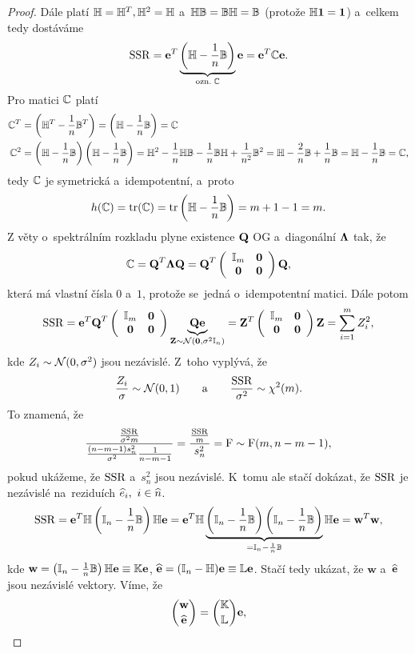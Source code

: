 \begin{proof}
Dále platí $\mathbb{H} = \mathbb{H}^T, \mathbb{H}^2 = \mathbb{H}$ a~$\mathbb{H} \mathbb{B} = \mathbb{B} \mathbb{H} = \mathbb{B}$ (protože $\mathbb{H} \mathbf{1} = \mathbf{1}$) a~celkem tedy dostáváme
 $$
\mathrm{SSR} = \mathbf{e}^T \underbrace{\left(\mathbb{H} - \frac{1}{n} \mathbb{B} \right)}_{\text{ozn.} \; \mathbb{C}} \mathbf{e} = \mathbf{e}^T \mathbb{C} \mathbf{e}.
 $$
Pro matici $\mathbb{C}$ platí
\begin{align*}
\mathbb{C}^T & = \left(\mathbb{H}^T - \frac{1}{n} \mathbb{B}^T \right) = \left(\mathbb{H} - \frac{1}{n} \mathbb{B} \right) = \mathbb{C} \\
\mathbb{C}^2 & = \left(\mathbb{H} - \frac{1}{n} \mathbb{B} \right)\left(\mathbb{H} - \frac{1}{n} \mathbb{B} \right) = \mathbb{H}^2 - \frac{1}{n} \mathbb{H} \mathbb{B} - \frac{1}{n} \mathbb{B} \mathbb{H} + \frac{1}{n^2} \mathbb{B}^2 = \mathbb{H} - \frac{2}{n} \mathbb{B} + \frac{1}{n} \mathbb{B} = \mathbb{H} - \frac{1}{n} \mathbb{B} = \mathbb{C},
\end{align*}
tedy $\mathbb{C}$ je symetrická a~idempotentní, a~proto
 $$
h(\mathbb{C}) = \mathrm{tr}(\mathbb{C}) = \mathrm{tr} \left(\mathbb{H} - \frac{1}{n} \mathbb{B} \right) = m + 1 - 1 = m.
 $$
Z věty o~spektrálním rozkladu plyne existence $\textbf{Q}$ OG a~diagonální $\mathbf{\Lambda}$ tak, že
 $$ \mathbb{C} = \textbf{Q}^T \mathbf{\Lambda} \textbf{Q} = \textbf{Q}^T \left(\begin{array}{cc}
\mathbb{I}_{m}&\boldsymbol{0}  \\
\boldsymbol{0}& \boldsymbol{0}
\end{array}
 \right)\textbf{Q}, $$
která má vlastní čísla $0$ a~$1$, protože se~jedná o~idempotentní matici. Dále potom
 $$ \mathrm{SSR} = \mathbf{e}^T\textbf{Q}^T\left(\begin{array}{cc}
 \mathbb{I}_{m}&\boldsymbol{0}  \\
 \boldsymbol{0}& \boldsymbol{0}
 \end{array}
 \right)\underbrace{\textbf{Q}\mathbf{e}}_{\mathbf{Z}\sim\mathcal{N}(\boldsymbol{0},\sigma^2 \mathbb{I}_{n})} = \mathbf{Z}^T\left(\begin{array}{cc}
 \mathbb{I}_{m}&\boldsymbol{0}  \\
 \boldsymbol{0}& \boldsymbol{0}
 \end{array}
 \right)\mathbf{Z} = \sum_{i=1}^m Z_i^2, $$
 kde $Z_i\sim\mathcal{N}(0,\sigma^2)$ jsou nezávislé. Z~toho vyplývá, že
 $$ \frac{Z_i}{\sigma}\sim\mathcal{N}(0,1)\qquad\text{a}\qquad\frac{\mathrm{SSR}}{\sigma^2}\sim\chi^2(m). $$
 To znamená, že
 $$ \frac{\frac{\mathrm{SSR}}{\sigma^2 m}}{\frac{(n-m-1)s_n^2}{\sigma^2}\frac{1}{n-m-1}} = \frac{\frac{\mathrm{SSR}}{m}}{s_n^2} = \mathrm{F}\sim \mathrm{F}(m,n-m-1), $$
 pokud ukážeme, že $\mathrm{SSR}$ a~$s_n^2$ jsou nezávislé. K~tomu ale stačí dokázat, že $\mathrm{SSR}$ je nezávislé na~reziduích $\widehat{e}_i,~i\in\widehat{n}$.
 $$ \mathrm{SSR} = \mathbf{e}^T\mathbb{H}\left(\mathbb{I}_{n}-\frac{1}{n}\mathbb{B} \right)\mathbb{H}\mathbf{e} = \mathbf{e}^T\mathbb{H}\underbrace{\left(\mathbb{I}_{n}-\frac{1}{n}\mathbb{B}\right)\left(\mathbb{I}_{n}-\frac{1}{n}\mathbb{B}\right)}_{ = \mathbb{I}_{n}-\frac{1}{n}\mathbb{B}}\mathbb{H}\mathbf{e} = \textbf{w}^T\textbf{w}, $$
 kde $\textbf{w} = \left(\mathbb{I}_{n}-\frac{1}{n}\mathbb{B}\right)\mathbb{H}\mathbf{e}\equiv \mathbb{K}\mathbf{e}$, $\widehat{\mathbf{e}} = (\mathbb{I}_{n}-\mathbb{H})\mathbf{e}\equiv \mathbb{L}\mathbf{e}$. Stačí tedy ukázat, že $\textbf{w}$ a~$\widehat{\mathbf{e}}$ jsou nezávislé vektory. Víme, že
 $$ \binom{\textbf{w}}{\widehat{\mathbf{e}}} = \binom{\mathbb{K}}{\mathbb{L}} \mathbf{e}, $$

\end{proof}
